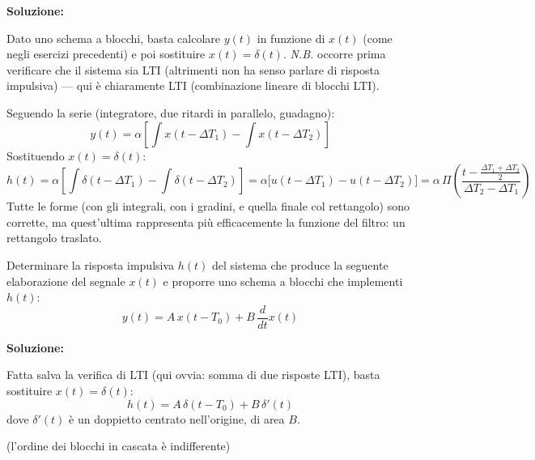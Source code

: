 \documentclass[12pt, a4paper]{article}
\begin{document}
\textbf{Soluzione:}

Dato uno schema a blocchi, basta calcolare $y(t)$ in funzione di $x(t)$ (come negli esercizi precedenti) e poi sostituire $x(t)=\delta(t)$. \textit{N.B.} occorre prima verificare che il sistema sia LTI (altrimenti non ha senso parlare di risposta impulsiva) — qui è chiaramente LTI (combinazione lineare di blocchi LTI).

Seguendo la serie (integratore, due ritardi in parallelo, guadagno):
$$y(t) = \alpha\left[\int x(t-\Delta T_1)-\int x(t-\Delta T_2)\right]$$
Sostituendo $x(t)=\delta(t)$:
$$h(t) = \alpha\left[\int\delta(t-\Delta T_1)-\int\delta(t-\Delta T_2)\right] = \alpha\big[u(t-\Delta T_1)-u(t-\Delta T_2)\big] = \alpha\,\Pi\!\left(\frac{t-\frac{\Delta T_1+\Delta T_2}{2}}{\Delta T_2-\Delta T_1}\right)$$
Tutte le forme (con gli integrali, con i gradini, e quella finale col rettangolo) sono corrette, ma quest'ultima rappresenta più efficacemente la funzione del filtro: un rettangolo traslato.

\bigskip

\begin{tcolorbox}[colback=lightergray!10, colframe=tocsec, title=\textbf{Esercizio 6}]
Determinare la risposta impulsiva $h(t)$ del sistema che produce la seguente elaborazione del segnale $x(t)$ e proporre uno schema a blocchi che implementi $h(t)$:
$$y(t) = A\,x(t-T_0)+B\,\frac{d}{dt}x(t)$$
\end{tcolorbox}

\textbf{Soluzione:}

Fatta salva la verifica di LTI (qui ovvia: somma di due risposte LTI), basta sostituire $x(t)=\delta(t)$:
$$h(t) = A\,\delta(t-T_0)+B\,\delta'(t)$$
dove $\delta'(t)$ è un doppietto centrato nell'origine, di area $B$.

\begin{center}
\end{center}
(l'ordine dei blocchi in cascata è indifferente)
\end{document}
